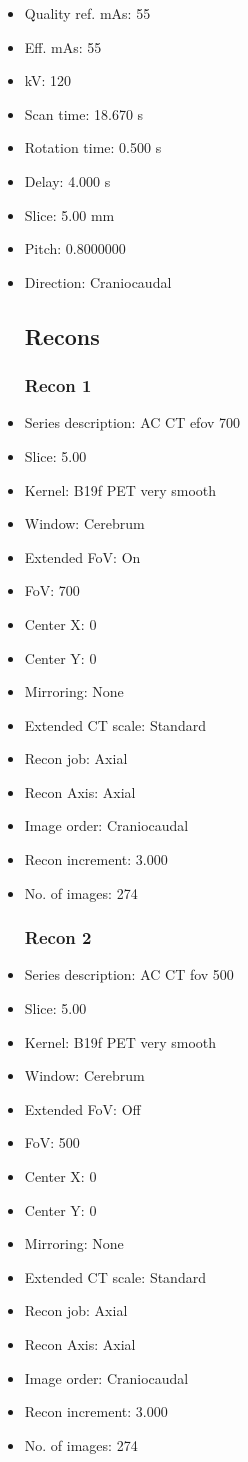 \documentclass[12pt]{article}
\begin{document}
\begin{itemize}
\subsection{Scan}
\item Quality ref. mAs: 55\item Eff. mAs: 55\item kV: 120\item Scan time: 18.670 s\item Rotation time: 0.500 s\item Delay: 4.000 s\item Slice: 5.00 mm\item Pitch: 0.8000000\item Direction: Craniocaudal\subsection{Recons}

\subsubsection{Recon 1}
\item Series description: AC CT efov 700
\item Slice: 5.00
\item Kernel: B19f PET very smooth
\item Window: Cerebrum
\item Extended FoV: On
\item FoV: 700
\item Center X: 0
\item Center Y: 0
\item Mirroring: None
\item Extended CT scale: Standard
\item Recon job: Axial
\item Recon Axis: Axial
\item Image order: Craniocaudal
\item Recon increment: 3.000
\item No. of images: 274
\subsubsection{Recon 2}
\item Series description: AC CT fov 500
\item Slice: 5.00
\item Kernel: B19f PET very smooth
\item Window: Cerebrum
\item Extended FoV: Off
\item FoV: 500
\item Center X: 0
\item Center Y: 0
\item Mirroring: None
\item Extended CT scale: Standard
\item Recon job: Axial
\item Recon Axis: Axial
\item Image order: Craniocaudal
\item Recon increment: 3.000
\item No. of images: 274

\end{itemize}
\end{document}
